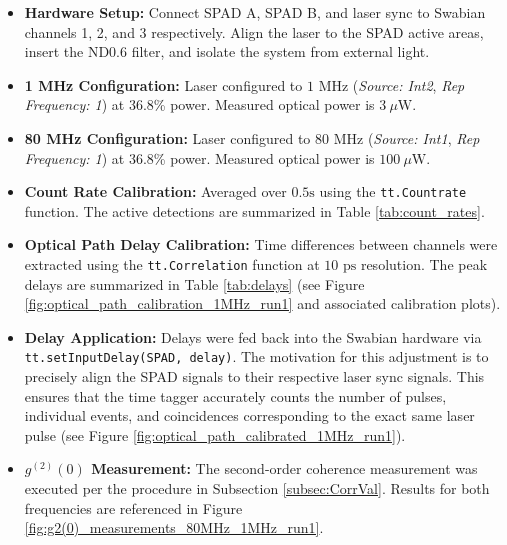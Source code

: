 \begin{itemize}
    \item \textbf{Hardware Setup:} Connect SPAD A, SPAD B, and laser sync to Swabian channels 1, 2, and 3 respectively. Align the laser to the SPAD active areas, insert the ND0.6 filter, and isolate the system from external light.
    \item \textbf{1 MHz Configuration:} Laser configured to $1\text{ MHz}$ (\textit{Source: Int2}, \textit{Rep Frequency: 1}) at 36.8\% power. Measured optical power is $3\ \mu\text{W}$.
    \item \textbf{80 MHz Configuration:} Laser configured to $80\text{ MHz}$ (\textit{Source: Int1}, \textit{Rep Frequency: 1}) at 36.8\% power. Measured optical power is $100\ \mu\text{W}$.
    \item \textbf{Count Rate Calibration:} Averaged over $0.5\text{s}$ using the \texttt{tt.Countrate} function. The active detections are summarized in Table \ref{tab:count_rates}.
    \item \textbf{Optical Path Delay Calibration:} Time differences between channels were extracted using the \texttt{tt.Correlation} function at $10\text{ ps}$ resolution. The peak delays are summarized in Table \ref{tab:delays} (see Figure \ref{fig:optical_path_calibration_1MHz_run1} and associated calibration plots). 
    \item \textbf{Delay Application:} Delays were fed back into the Swabian hardware via \texttt{tt.setInputDelay(SPAD, delay)}. The motivation for this adjustment is to precisely align the SPAD signals to their respective laser sync signals. This ensures that the time tagger accurately counts the number of pulses, individual events, and coincidences corresponding to the exact same laser pulse (see Figure \ref{fig:optical_path_calibrated_1MHz_run1}).
    \item \textbf{$g^{(2)}(0)$ Measurement:} The second-order coherence measurement was executed per the procedure in Subsection \ref{subsec:CorrVal}. Results for both frequencies are referenced in Figure \ref{fig:g2(0)_measurements_80MHz_1MHz_run1}.
\end{itemize}

\begin{table}[htbp]
    \centering
    \caption{Average count rates (cps) over $0.5s$}
    \label{tab:count_rates}
\end{table}

